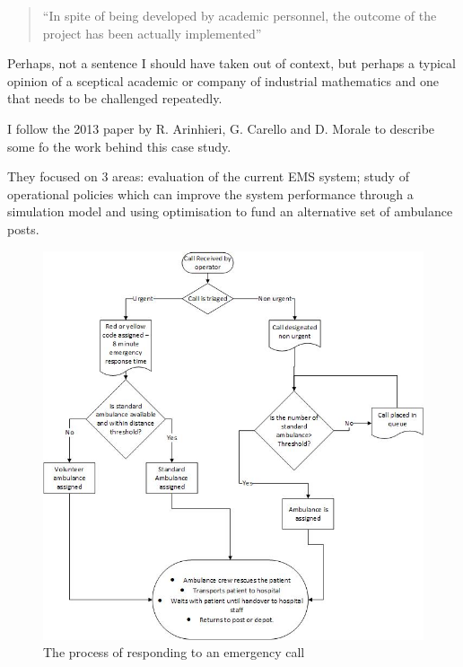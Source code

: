 \documentclass[11pt]{article} %
\begin{document}
	\begin{quote}
		``In spite of being developed by academic personnel, the outcome of the project has been actually implemented''
	\end{quote}

	Perhaps, not a sentence I should have taken out of context, but perhaps a typical  opinion of a sceptical academic or company of industrial mathematics and one that needs to be challenged repeatedly. 
	
	

	I follow the 2013 paper by R. Arinhieri, G. Carello and D. Morale \cite{Carello2013}  to describe some fo the work behind this case study.
	
	They focused on 3 areas: evaluation of the current EMS system; study of operational policies which can improve the system performance through a simulation model and using optimisation to fund an alternative set of ambulance posts. 
	\begin{figure}
		\centering
		\includegraphics[width=\linewidth]{Report_images/MilanEMS}
		\caption{The process of responding to an emergency call}
		\label{fig:milanems}
	\end{figure}
\end{document}

